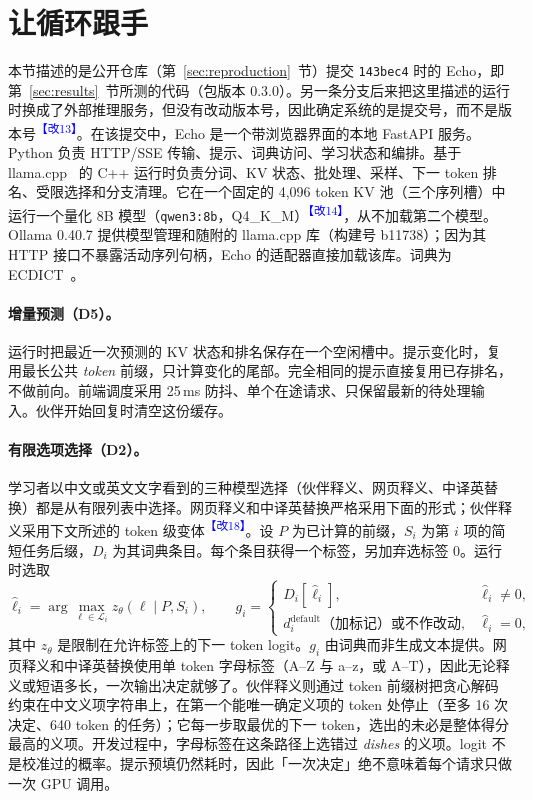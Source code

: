 \documentclass[11pt,a4paper,fontset=windows]{ctexart}
\newcommand{\code}[1]{\texttt{#1}}
\newcommand{\audit}[1]{\textcolor{blue}{\textsuperscript{【改#1】}}}
\begin{document}
\section{让循环跟手}
\label{sec:implementation}
本节描述的是公开仓库（第~\ref{sec:reproduction}~节）提交 \code{143bec4} 时的 Echo，即第~\ref{sec:results}~节所测的代码（包版本 0.3.0）。另一条分支后来把这里描述的运行时换成了外部推理服务，但没有改动版本号，因此确定系统的是提交号，而不是版本号\audit{13}。在该提交中，Echo 是一个带浏览器界面的本地 FastAPI 服务。Python 负责 HTTP/SSE 传输、提示、词典访问、学习状态和编排。基于 llama.cpp~\cite{llamacpp} 的 C++ 运行时负责分词、KV 状态、批处理、采样、下一 token 排名、受限选择和分支清理。它在一个固定的 4,096 token KV 池（三个序列槽）中运行一个量化 8B 模型（\code{qwen3:8b}，Q4\_K\_M）\audit{14}，从不加载第二个模型。Ollama 0.40.7 提供模型管理和随附的 llama.cpp 库（构建号 b11738）；因为其 HTTP 接口不暴露活动序列句柄，Echo 的适配器直接加载该库。词典为 ECDICT~\cite{ecdict}。

\paragraph{增量预测（D5）。}运行时把最近一次预测的 KV 状态和排名保存在一个空闲槽中。提示变化时，复用最长公共 \emph{token} 前缀，只计算变化的尾部。完全相同的提示直接复用已存排名，不做前向。前端调度采用 25\,ms 防抖、单个在途请求、只保留最新的待处理输入。伙伴开始回复时清空这份缓存。

\paragraph{有限选项选择（D2）。}学习者以中文或英文文字看到的三种模型选择（伙伴释义、网页释义、中译英替换）都是从有限列表中选择。网页释义和中译英替换严格采用下面的形式；伙伴释义采用下文所述的 token 级变体\audit{18}。设 $P$ 为已计算的前缀，$S_i$ 为第 $i$ 项的简短任务后缀，$D_i$ 为其词典条目。每个条目获得一个标签，另加弃选标签 $0$。运行时选取
\begin{equation}
 \hat{\ell}_i = \arg\max_{\ell\in\mathcal L_i} z_\theta(\ell\mid P,S_i),\qquad
 g_i = \begin{cases}D_i[\hat{\ell}_i],&\hat{\ell}_i\ne0,\\ d_i^{\mathrm{default}}\text{（加标记）或不作改动},&\hat{\ell}_i=0,\end{cases}
\end{equation}
其中 $z_\theta$ 是限制在允许标签上的下一 token logit。$g_i$ 由词典而非生成文本提供。网页释义和中译英替换使用单 token 字母标签（A--Z 与 a--z，或 A--T），因此无论释义或短语多长，一次输出决定就够了。伙伴释义则通过 token 前缀树把贪心解码约束在中文义项字符串上，在第一个能唯一确定义项的 token 处停止（至多 16 次决定、640 token 的任务）；它每一步取最优的下一 token，选出的未必是整体得分最高的义项。开发过程中，字母标签在这条路径上选错过 \emph{dishes} 的义项。logit 不是校准过的概率。提示预填仍然耗时，因此「一次决定」绝不意味着每个请求只做一次 GPU 调用。
\end{document}
